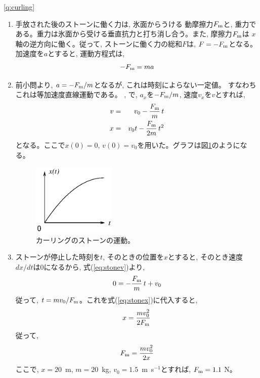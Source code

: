\ref{q:curling}
\begin{enumerate}
\item 手放された後のストーンに働く力は, 氷面からうける
動摩擦力$F_{\text m}$と, 重力である。重力は氷面から受ける垂直抗力と打ち消し合う。また, 摩擦力$F_{\text m}$は
$x$軸の逆方向に働く。従って, ストーンに働く力の総和$F$は, $F=-F_{\text m}$となる。加速度を$a$とすると, 
運動方程式は, 
\begin{eqnarray}
-F_{\text m}=ma
\end{eqnarray}
\item 前小問より, $a=-F_{\text m}/m$となるが, これは時刻によらない一定値。
すなわちこれは等加速度直線運動である。
, で, $a_x$を$-F_{\text m}/m$, 
速度$v_x$を$v$とすれば, 
\begin{eqnarray}
v&=&v_0-\frac{F_{\text m}}{m}\,t\label{eq:stonev}\\
x&=&v_0t-\frac{F_{\text m}}{2m}\,t^2\label{eq:stonex}
\end{eqnarray}
となる。ここで$x(0)=0$, $v(0)=v_0$を用いた。グラフは図\ref{fig:stone}のようになる。
\begin{figure}[h]
    \centering
    \includegraphics[width=4cm]{stone.eps}
    \caption{カーリングのストーンの運動。}\label{fig:stone}
\end{figure}
\item ストーンが停止した時刻を$t$, そのときの位置を$x$とすると, 
そのとき速度$dx/dt$は0になるから, 
式(\ref{eq:stonev})より, 
\begin{eqnarray}
0=-\frac{F_{\text m}}{m}\,t+v_0
\end{eqnarray}
従って, $t=mv_0/F_{\text m}$。これを式(\ref{eq:stonex})に代入すると, 
\begin{eqnarray}
x=\frac{mv_0^2}{2F_{\text m}}\label{eq:stonexx}
\end{eqnarray}
従って, 
\begin{eqnarray}
F_{\text m}=\frac{mv_0^2}{2x}\label{eq:stoneFm}
\end{eqnarray}
ここで, $x=20$~m, $m=20$~kg, $v_0=1.5$~m~s$^{-1}$とすれば, $F_{\text m}=1.1$ N。

\end{enumerate}
